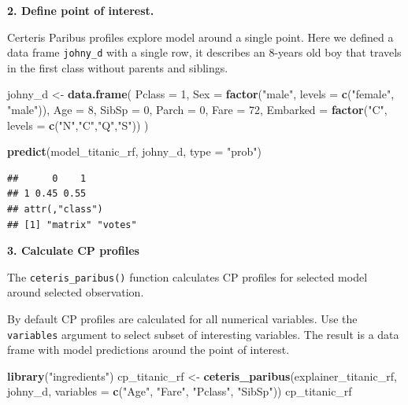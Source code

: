 \documentclass[]{krantz}
\newenvironment{Shaded}{\begin{snugshade}}{\end{snugshade}}
\newcommand{\DataTypeTok}[1]{\textcolor[rgb]{0.13,0.29,0.53}{#1}}
\newcommand{\DecValTok}[1]{\textcolor[rgb]{0.00,0.00,0.81}{#1}}
\newcommand{\KeywordTok}[1]{\textcolor[rgb]{0.13,0.29,0.53}{\textbf{#1}}}
\newcommand{\NormalTok}[1]{#1}
\newcommand{\StringTok}[1]{\textcolor[rgb]{0.31,0.60,0.02}{#1}}
\theoremstyle{definition}
\theoremstyle{definition}
\theoremstyle{definition}
\theoremstyle{remark}
\begin{document}
\textbf{2. Define point of interest.}

Certeris Paribus profiles explore model around a single point. Here we
defined a data frame \texttt{johny\_d} with a single row, it describes
an 8-years old boy that travels in the first class without parents and
siblings.

\begin{Shaded}
\begin{Highlighting}[]
\NormalTok{johny_d <-}\StringTok{ }\KeywordTok{data.frame}\NormalTok{(}
  \DataTypeTok{Pclass =} \DecValTok{1}\NormalTok{,}
  \DataTypeTok{Sex =} \KeywordTok{factor}\NormalTok{(}\StringTok{"male"}\NormalTok{, }\DataTypeTok{levels =} \KeywordTok{c}\NormalTok{(}\StringTok{"female"}\NormalTok{, }\StringTok{"male"}\NormalTok{)),}
  \DataTypeTok{Age =} \DecValTok{8}\NormalTok{,}
  \DataTypeTok{SibSp =} \DecValTok{0}\NormalTok{,}
  \DataTypeTok{Parch =} \DecValTok{0}\NormalTok{,}
  \DataTypeTok{Fare =} \DecValTok{72}\NormalTok{,}
  \DataTypeTok{Embarked =} \KeywordTok{factor}\NormalTok{(}\StringTok{"C"}\NormalTok{, }\DataTypeTok{levels =} \KeywordTok{c}\NormalTok{(}\StringTok{"N"}\NormalTok{,}\StringTok{"C"}\NormalTok{,}\StringTok{"Q"}\NormalTok{,}\StringTok{"S"}\NormalTok{))}
\NormalTok{)}

\KeywordTok{predict}\NormalTok{(model_titanic_rf, johny_d, }\DataTypeTok{type =} \StringTok{"prob"}\NormalTok{)}
\end{Highlighting}
\end{Shaded}

\begin{verbatim}
##      0    1
## 1 0.45 0.55
## attr(,"class")
## [1] "matrix" "votes"
\end{verbatim}

\textbf{3. Calculate CP profiles}

The \texttt{ceteris\_paribus()} function calculates CP profiles for
selected model around selected observation.

By default CP profiles are calculated for all numerical variables. Use
the \texttt{variables} argument to select subset of interesting
variables. The result is a data frame with model predictions around the
point of interest.

\begin{Shaded}
\begin{Highlighting}[]
\KeywordTok{library}\NormalTok{(}\StringTok{"ingredients"}\NormalTok{)}
\NormalTok{cp_titanic_rf <-}\StringTok{ }\KeywordTok{ceteris_paribus}\NormalTok{(explainer_titanic_rf, johny_d, }
                            \DataTypeTok{variables =} \KeywordTok{c}\NormalTok{(}\StringTok{"Age"}\NormalTok{, }\StringTok{"Fare"}\NormalTok{, }\StringTok{"Pclass"}\NormalTok{, }\StringTok{"SibSp"}\NormalTok{))}
\NormalTok{cp_titanic_rf}
\end{Highlighting}
\end{Shaded}
\end{document}
